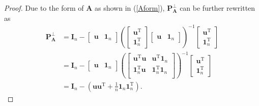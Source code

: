\begin{proof}
	Due to the form of $\mathbf  A$ as shown in (\ref{Aform}), 
$ \mathbf  P_{\mathbf  A }^{\bot} $ can be   further  rewritten as   
\begin{align}\label{projecteddenote}
\mathbf  P_{\mathbf  A } ^{\bot}
\nonumber
&=
\mathbf  I_{n}  -
\begin{bmatrix}
\mathbf u  &
\mathbf 1_{n}
\end{bmatrix}
(
\begin{bmatrix}
\mathbf u^{\mathrm T} \\
\mathbf 1_{n}^{\mathrm T}
\end{bmatrix}
\begin{bmatrix}
\mathbf u  &
\mathbf 1_{n}
\end{bmatrix}
)
^{-1}
\begin{bmatrix}
\mathbf u^{\mathrm T} \\
\mathbf 1_{n}^{\mathrm T}
\end{bmatrix}
\\ \nonumber
&=
\mathbf  I_{n}  -
\begin{bmatrix}
\mathbf u  &
\mathbf 1_{n}
\end{bmatrix}
(
\begin{bmatrix}
\mathbf u^{\mathrm T}\mathbf u &  \mathbf u^{\mathrm T}\mathbf 1_{n}   \\
\mathbf 1_{n} ^{\mathrm T} \mathbf u& \mathbf 1_{n}^{\mathrm T}\mathbf 1_{n}  \\
\end{bmatrix}
)
^{-1}
\begin{bmatrix}
\mathbf u^{\mathrm T} \\
\mathbf 1_{n}^{\mathrm T}
\end{bmatrix}
\\ 
&=
\mathbf  I_{n}  - 
(\mathbf u\mathbf u^{\mathrm T}  
+ \frac  1n \mathbf 1_{n}\mathbf 1_{n}^{\mathrm T} ). 

\end{align}
\end{proof}
